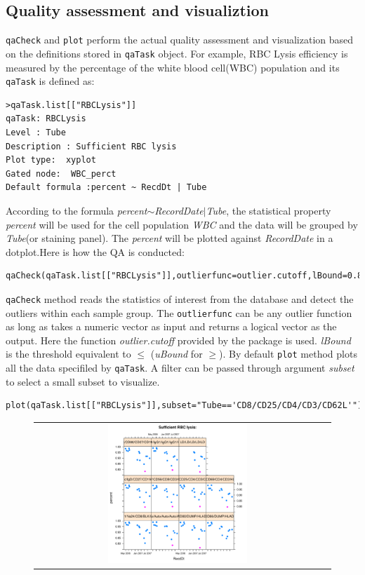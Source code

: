 \documentclass[10pt]{bmc_article}
\newenvironment{bmcformat}{\baselineskip20pt\sloppy\setboolean{publ}{false}}{\baselineskip20pt\sloppy}
\begin{document}
\begin{bmcformat}
\subsection{Quality assessment and visualiztion} 
\texttt{qaCheck} and \texttt{plot} perform the actual quality assessment and
visualization based on the definitions stored in \texttt{qaTask} object. For example, RBC
Lysis efficiency is measured by the percentage of the white blood cell(WBC) population and its \texttt{qaTask} is defined as:
\begin{verbatim}
>qaTask.list[["RBCLysis"]]
qaTask: RBCLysis 
Level : Tube 
Description : Sufficient RBC lysis 
Plot type:  xyplot
Gated node:  WBC_perct
Default formula :percent ~ RecdDt | Tube
\end{verbatim}
According to the formula \emph{percent$\sim$RecordDate$|$Tube}, the statistical
property \emph{percent} will be used for the cell population \emph{WBC} and the
data will be grouped by \emph{Tube}(or staining panel). The \emph{percent}
will be plotted against \emph{RecordDate} in a dotplot.Here is how the QA is
conducted:
\begin{verbatim}
qaCheck(qaTask.list[["RBCLysis"]],outlierfunc=outlier.cutoff,lBound=0.8)
\end{verbatim}
\texttt{qaCheck} method reads the statistics of interest from the database
and detect the outliers within each sample group. The
\texttt{outlierfunc} can be any outlier function as long as takes a numeric
vector as input and returns a logical vector as the output. 
Here the function \emph{outlier.cutoff} provided by the package is used.
\emph{lBound} is the threshold equivalent to $\leq$ (\emph{uBound} for $\geq$).
By default \texttt{plot} method plots all the data specifiled by \texttt{qaTask}.
A filter can be passed through argument \emph{subset} to select a small subset to
visualize.
 \begin{verbatim}
plot(qaTask.list[["RBCLysis"]],subset="Tube=='CD8/CD25/CD4/CD3/CD62L'")
\end{verbatim}%
\begin{figure}[h]
\begin{tabular}{cc}
\includegraphics[width=0.5\textwidth]{image/RBCLysis_all.pdf}&

\end{tabular}
\end{figure}
\end{bmcformat}
\end{document}
